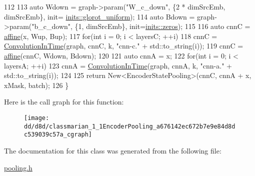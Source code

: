 \begin{DoxyCode}
112 
113     \textcolor{keyword}{auto} Wdown = graph->param(\textcolor{stringliteral}{"W\_c\_down"}, \{2 * dimSrcEmb, dimSrcEmb\}, init=
      \hyperlink{namespacemarian_1_1inits_a8838c47537f434b855491cd3ed97ccd1}{inits::glorot\_uniform});
114     \textcolor{keyword}{auto} Bdown = graph->param(\textcolor{stringliteral}{"b\_c\_down"}, \{1, dimSrcEmb\}, init=\hyperlink{namespacemarian_1_1inits_a1bd34fd256e3df7bb1e27955a7f2b359}{inits::zeros});
115 
116     \textcolor{keyword}{auto} cnnC = \hyperlink{namespacemarian_aefe65d738dc9a0536f3a1f9346b8d47b}{affine}(x, Wup, Bup);
117     \textcolor{keywordflow}{for}(\textcolor{keywordtype}{int} i = 0; i < layersC; ++i)
118        cnnC = \hyperlink{namespacemarian_ae5b4088136fa6f7ebc01aed5a2d65c5c}{ConvolutionInTime}(graph, cnnC, k, \textcolor{stringliteral}{"cnn-c."} + std::to\_string(i));
119     cnnC = \hyperlink{namespacemarian_aefe65d738dc9a0536f3a1f9346b8d47b}{affine}(cnnC, Wdown, Bdown);
120 
121     \textcolor{keyword}{auto} cnnA = x;
122     \textcolor{keywordflow}{for}(\textcolor{keywordtype}{int} i = 0; i < layersA; ++i)
123        cnnA = \hyperlink{namespacemarian_ae5b4088136fa6f7ebc01aed5a2d65c5c}{ConvolutionInTime}(graph, cnnA, k, \textcolor{stringliteral}{"cnn-a."} + std::to\_string(i));
124 
125     \textcolor{keywordflow}{return} New<EncoderStatePooling>(cnnC, cnnA + x, xMask, batch);
126   \}
\end{DoxyCode}


Here is the call graph for this function\+:
\nopagebreak
\begin{figure}[H]
\begin{center}
\leavevmode
\texttt{[image: dd/d8d/classmarian\_1\_1EncoderPooling\_a676142ec672b7e9e84d8dc539039c57a\_cgraph]}
\end{center}
\end{figure}




The documentation for this class was generated from the following file\+:\begin{DoxyCompactItemize}
\item 
\hyperlink{pooling_8h}{pooling.\+h}\end{DoxyCompactItemize}
